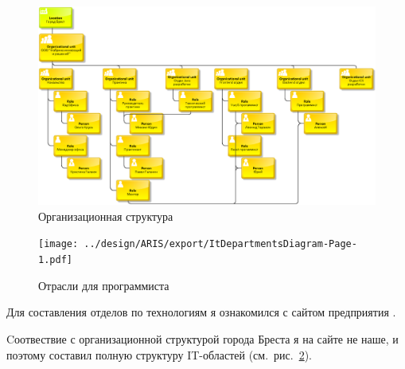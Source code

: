 \begin{figure}[!ph]
  \centering

  \includegraphics[width=16cm]
  {../design/ARIS/OrganizationalChart.adf.png}

  \caption{Организационная структура}
  \label{fig:OrganizationalChart}
\end{figure}

\begin{figure}[!ph]
  \centering

  \texttt{[image: ../design/ARIS/export/ItDepartmentsDiagram-Page-1.pdf]}

  \caption{Отрасли для программиста}
  \label{fig:ItDepartmentsDiagram}
\end{figure}


Для составления отделов по технологиям я ознакомился с сайтом предприятия \cite{InnowiseItDepartment}.

Cоотвествие с организационной структурой города Бреста я на сайте не наше,
и поэтому составил полную структуру IT-областей
(см.~рис.~\ref{fig:ItDepartmentsDiagram}).
